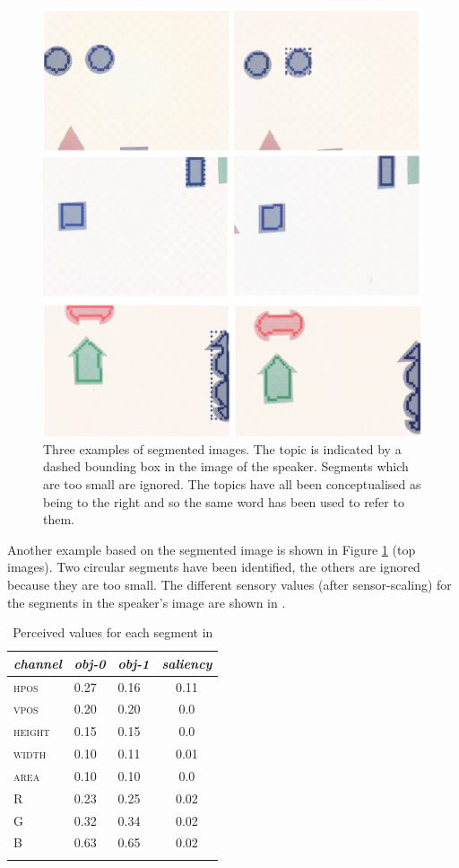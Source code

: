 \begin{figure}[hbtp]
\begin{center}
\includegraphics[width=0.8\columnwidth]{chap7/figs/plate-10.pdf}
\end{center}
\caption{Three examples of segmented images. The 
topic is indicated by a dashed bounding box in the 
image of the speaker. Segments which are too small 
are ignored. The topics have all been conceptualised
as being to the right and so the same word 
 has been used to refer to them. }
\label{f:plate-10}
\end{figure}

Another example based on the segmented image is shown in Figure 
\ref{f:plate-10} (top images). Two circular segments
have been identified, the others are ignored because they are 
too small. The different sensory values (after sensor-scaling)
for the segments in the speaker's image are shown in . 


\begin{table}[t]
\begin{center}
\begin{tabular}{  l   l   l   c  } \lsptoprule
{\itshape channel}& {\itshape obj-0} & {\itshape obj-1} & {\itshape saliency}\\ \midrule
\textsc{hpos} & 0.27 & 0.16 & 0.11\\ 
\textsc{vpos} & 0.20 & 0.20 & 0.0\\ 
\textsc{height} & 0.15 & 0.15 & 0.0\\ 
\textsc{width} & 0.10 & 0.11 & 0.01\\ 
\textsc{area} & 0.10 & 0.10 & 0.0\\ 
\textsc{R} & 0.23 & 0.25 & 0.02\\ 
\textsc{G} & 0.32 & 0.34 & 0.02\\ 
\textsc{B} & 0.63 & 0.65 & 0.02\\ 
\lspbottomrule
\end{tabular}
\caption{Perceived values for each segment in 
\label{tab:t-plate10}}
\end{center}
\end{table}

